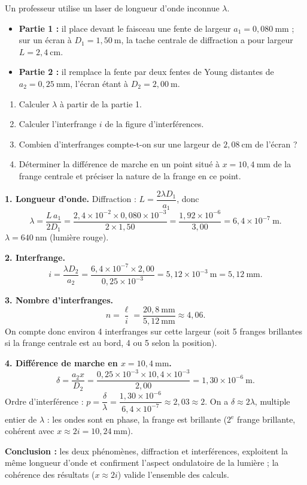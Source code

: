 \documentclass[11pt]{article}
\newcommand{\cle}[1]{{\popxbold\color{popdark}#1}}
\begin{document}
\begin{exoresolu}
Un professeur utilise un laser de longueur d'onde inconnue $\lambda$.
\begin{itemize}
\item \textbf{Partie 1 :} il place devant le faisceau une fente de largeur $a_1 = 0,080\ \text{mm}$ ; sur un écran à $D_1 = 1,50\ \text{m}$, la tache centrale de diffraction a pour largeur $L = 2,4\ \text{cm}$.
\item \textbf{Partie 2 :} il remplace la fente par deux fentes de Young distantes de $a_2 = 0,25\ \text{mm}$, l'écran étant à $D_2 = 2,00\ \text{m}$.
\end{itemize}
\begin{enumerate}
\item Calculer $\lambda$ à partir de la partie 1.
\item Calculer l'interfrange $i$ de la figure d'interférences.
\item Combien d'interfranges compte-t-on sur une largeur de $2,08\ \text{cm}$ de l'écran ?
\item Déterminer la différence de marche en un point situé à $x = 10,4\ \text{mm}$ de la frange centrale et préciser la nature de la frange en ce point.
\end{enumerate}
\tcblower
\textbf{1. Longueur d'onde.} Diffraction : $L = \dfrac{2\lambda D_1}{a_1}$, donc
\[ \lambda = \frac{L\,a_1}{2D_1} = \frac{2,4\times 10^{-2} \times 0,080\times 10^{-3}}{2 \times 1,50} = \frac{1,92\times 10^{-6}}{3,00} = 6,4\times 10^{-7}\ \text{m}. \]
$\lambda = 640\ \text{nm}$ (lumière rouge).

\textbf{2. Interfrange.}
\[ i = \frac{\lambda D_2}{a_2} = \frac{6,4\times 10^{-7} \times 2,00}{0,25\times 10^{-3}} = 5,12\times 10^{-3}\ \text{m} = 5,12\ \text{mm}. \]

\textbf{3. Nombre d'interfranges.}
\[ n = \frac{\ell}{i} = \frac{20,8\ \text{mm}}{5,12\ \text{mm}} \approx 4,06. \]
On compte donc environ \cle{4 interfranges} sur cette largeur (soit 5 franges brillantes si la frange centrale est au bord, 4 ou 5 selon la position).

\textbf{4. Différence de marche en $x = 10,4\ \text{mm}$.}
\[ \delta = \frac{a_2 x}{D_2} = \frac{0,25\times 10^{-3} \times 10,4\times 10^{-3}}{2,00} = 1,30\times 10^{-6}\ \text{m}. \]
Ordre d'interférence : $p = \dfrac{\delta}{\lambda} = \dfrac{1,30\times 10^{-6}}{6,4\times 10^{-7}} \approx 2,03 \approx 2$. On a $\delta \approx 2\lambda$, multiple entier de $\lambda$ : les ondes sont en phase, la frange est \cle{brillante} (2$^{\text{e}}$ frange brillante, cohérent avec $x \approx 2i = 10,24\ \text{mm}$).

\textbf{Conclusion :} les deux phénomènes, diffraction et interférences, exploitent la même longueur d'onde et confirment l'aspect ondulatoire de la lumière ; la cohérence des résultats ($x \approx 2i$) valide l'ensemble des calculs.
\end{exoresolu}
\end{document}

